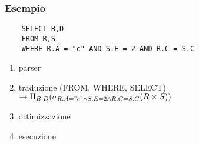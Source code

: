 \documentclass[12pt]{article}
\begin{document}
\subsubsection{Esempio}
\begin{verbatim}
    SELECT B,D
    FROM R,S
    WHERE R.A = "c" AND S.E = 2 AND R.C = S.C
\end{verbatim}
\begin{enumerate}
    \item parser
    \item traduzione (FROM, WHERE, SELECT) \(\rightarrow
        \Pi_{B,D}(\sigma_{R.A="c" \land S.E=2 \land R.C=S.C}(R \times S))  
      \)
    \item ottimizzazione 
    \item esecuzione
\end{enumerate}
\end{document}
